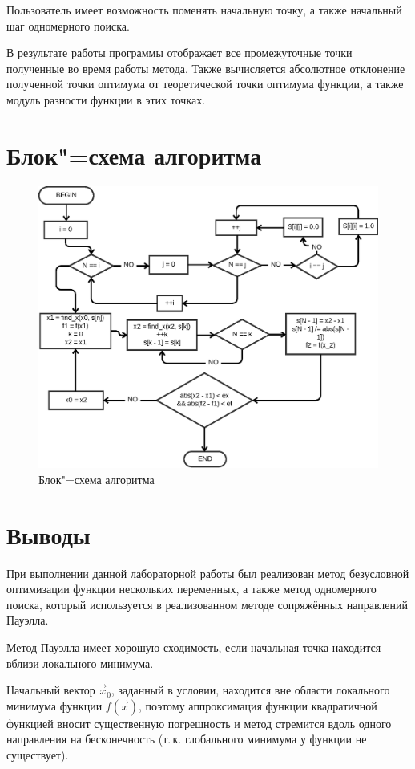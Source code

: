 \documentclass[a4paper,12pt,notitlepage,headsepline,pdftex]{scrartcl}
\begin{document}
  Пользователь имеет возможность поменять начальную точку, а также начальный
  шаг одномерного поиска.

  В результате работы программы отображает все промежуточные точки полученные
  во время работы метода.
  Также вычисляется абсолютное отклонение полученной точки оптимума от
  теоретической точки оптимума функции, а также модуль разности функции в этих
  точках.
  \newpage
\section{Блок"=схема алгоритма}
  \begin{figure}[h!]
    \begin{center}
      \includegraphics[scale=0.60]{flowchart.eps}
    \end{center}
    \caption{Блок"=схема алгоритма}
    \label{fig:flowchart}
  \end{figure}
  \newpage
\section{Выводы}
  При выполнении данной лабораторной работы был реализован метод безусловной
  оптимизации функции нескольких переменных, а также метод одномерного
  поиска, который используется в реализованном методе сопряжённых направлений
  Пауэлла.

  Метод Пауэлла имеет хорошую сходимость, если начальная точка находится
  вблизи локального минимума.

  Начальный вектор $\vec{x}_0$, заданный в условии, находится вне области
  локального минимума функции $f\left( \vec{x} \right)$, поэтому
  аппроксимация функции квадратичной функцией вносит существенную погрешность
  и метод стремится вдоль одного направления на бесконечность (т.\,к.
  глобального минимума у функции не существует).
\end{document}
